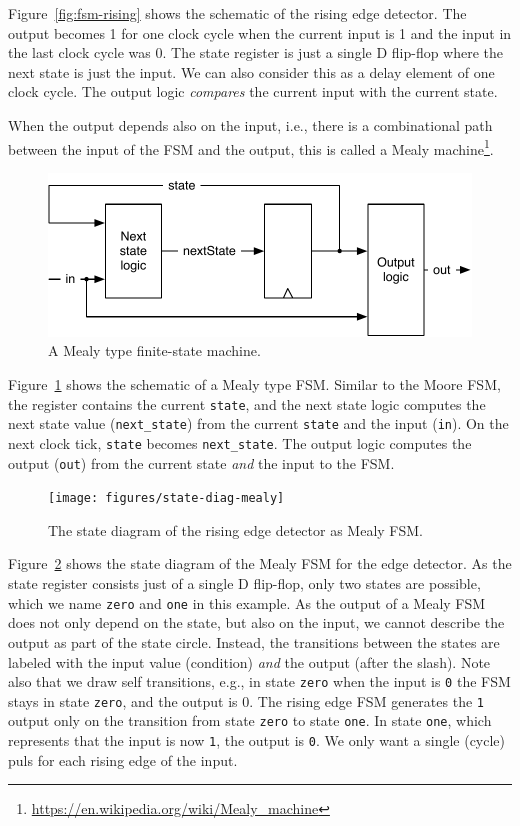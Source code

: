\documentclass[%
    10pt,
    headinclude, footexclude,
    openright, %
    notitlepage,
    cleardoubleempty,
    headsepline,
    pointlessnumbers,
    bibtotoc, idxtotoc,
    ]{scrbook}
\newcommand{\code}[1]{{\small{\texttt{#1}}}}
\newcommand{\scale}{0.7}
\newcommand{\myref}[2]{\href{#1}{#2}}
\renewcommand{\myref}[2]{{#2}{\footnote{\url{#1}}}}
\begin{document}
Figure~\ref{fig:fsm-rising} shows the schematic of the rising edge detector.
The output becomes 1 for one clock cycle when the current input is 1
and the input in the last clock cycle was 0.
The state register is just a single D flip-flop where the next state
is just the input. We can also consider this as a delay element of one
clock cycle. The output logic \emph{compares} the current
input with the current state.



When the output depends also on the input, i.e., there is a combinational path between
the input of the FSM and the output, this is called a
\myref{https://en.wikipedia.org/wiki/Mealy_machine}{Mealy machine}.

\begin{figure}
  \centering
  \includegraphics[scale=\scale]{figures/mealy}
  \caption{A Mealy type finite-state machine.}
  \label{fig:mealy}
\end{figure}

Figure~\ref{fig:mealy} shows the schematic of a Mealy type FSM.
Similar to the Moore FSM, the register contains the current \code{state}, and
the next state logic computes the next state value (\code{next\_state})
from the current \code{state} and the input (\code{in}).
On the next clock tick, \code{state} becomes \code{next\_state}.
The output logic computes the output (\code{out}) from the current state
\emph{and} the input to the FSM.


\begin{figure}
  \centering
  \texttt{[image: figures/state-diag-mealy]}
  \caption{The state diagram of the rising edge detector as Mealy FSM.}
  \label{fig:diag:mealy}
\end{figure}

Figure~\ref{fig:diag:mealy} shows the state diagram of the Mealy FSM for the
edge detector. As the state register consists just of a single D flip-flop,
only two states are possible, which we name \code{zero} and \code{one} in this
example.
As the output of a Mealy FSM does not only depend on the state, but also
on the input, we cannot describe the output as part of the state circle.
Instead, the transitions between the states are labeled with the input
value (condition) \emph{and} the output (after the slash).
Note also that we draw self transitions, e.g., in state \code{zero} when
the input is \code{0} the FSM stays in state \code{zero}, and the output is {0}.
The rising edge FSM generates the \code{1} output only on the transition
from state \code{zero} to state \code{one}. In state \code{one}, which represents
that the input is now \code{1}, the output is \code{0}. We only want a single (cycle)
puls for each rising edge of the input.
\end{document}
